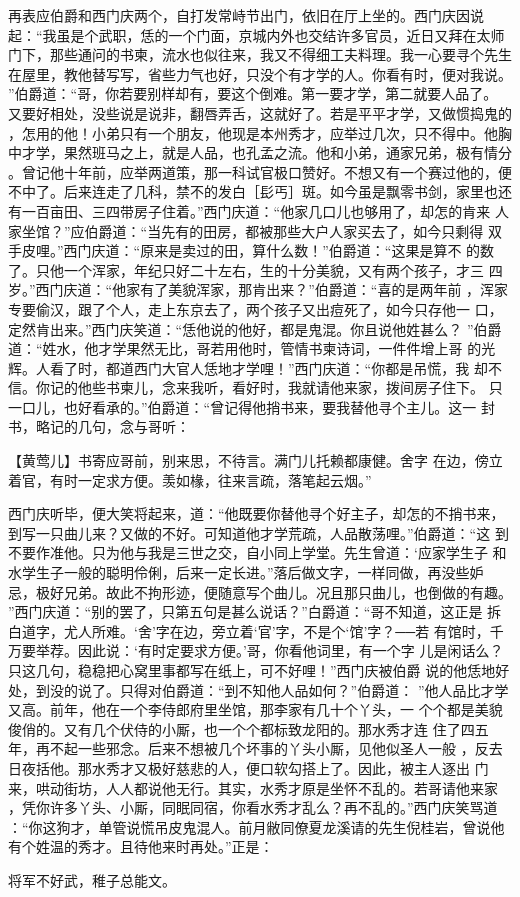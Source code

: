 再表应伯爵和西门庆两个，自打发常峙节出门，依旧在厅上坐的。西门庆因说
起：“我虽是个武职，恁的一个门面，京城内外也交结许多官员，近日又拜在太师
门下，那些通问的书柬，流水也似往来，我又不得细工夫料理。我一心要寻个先生
在屋里，教他替写写，省些力气也好，只没个有才学的人。你看有时，便对我说。
”伯爵道：“哥，你若要别样却有，要这个倒难。第一要才学，第二就要人品了。
又要好相处，没些说是说非，翻唇弄舌，这就好了。若是平平才学，又做惯捣鬼的
，怎用的他！小弟只有一个朋友，他现是本州秀才，应举过几次，只不得中。他胸
中才学，果然班马之上，就是人品，也孔孟之流。他和小弟，通家兄弟，极有情分
。曾记他十年前，应举两道策，那一科试官极口赞好。不想又有一个赛过他的，便
不中了。后来连走了几科，禁不的发白［髟丐］斑。如今虽是飘零书剑，家里也还
有一百亩田、三四带房子住着。”西门庆道：“他家几口儿也够用了，却怎的肯来
人家坐馆？”应伯爵道：“当先有的田房，都被那些大户人家买去了，如今只剩得
双手皮哩。”西门庆道：“原来是卖过的田，算什么数！”伯爵道：“这果是算不
的数了。只他一个浑家，年纪只好二十左右，生的十分美貌，又有两个孩子，才三
四岁。”西门庆道：“他家有了美貌浑家，那肯出来？”伯爵道：“喜的是两年前
，浑家专要偷汉，跟了个人，走上东京去了，两个孩子又出痘死了，如今只存他一
口，定然肯出来。”西门庆笑道：“恁他说的他好，都是鬼混。你且说他姓甚么？
”伯爵道：“姓水，他才学果然无比，哥若用他时，管情书柬诗词，一件件增上哥
的光辉。人看了时，都道西门大官人恁地才学哩！”西门庆道：“你都是吊慌，我
却不信。你记的他些书柬儿，念来我听，看好时，我就请他来家，拨间房子住下。
只一口儿，也好看承的。”伯爵道：“曾记得他捎书来，要我替他寻个主儿。这一
封书，略记的几句，念与哥听：

【黄莺儿】书寄应哥前，别来思，不待言。满门儿托赖都康健。舍字
在边，傍立着官，有时一定求方便。羡如椽，往来言疏，落笔起云烟。”

西门庆听毕，便大笑将起来，道：“他既要你替他寻个好主子，却怎的不捎书来，
到写一只曲儿来？又做的不好。可知道他才学荒疏，人品散荡哩。”伯爵道：“这
到不要作准他。只为他与我是三世之交，自小同上学堂。先生曾道：‘应家学生子
和水学生子一般的聪明伶俐，后来一定长进。”落后做文字，一样同做，再没些妒
忌，极好兄弟。故此不拘形迹，便随意写个曲儿。况且那只曲儿，也倒做的有趣。
”西门庆道：“别的罢了，只第五句是甚么说话？”白爵道：“哥不知道，这正是
拆白道字，尤人所难。‘舍’字在边，旁立着‘官’字，不是个‘馆’字？──若
有馆时，千万要举荐。因此说：‘有时定要求方便。’哥，你看他词里，有一个字
儿是闲话么？只这几句，稳稳把心窝里事都写在纸上，可不好哩！”西门庆被伯爵
说的他恁地好处，到没的说了。只得对伯爵道：“到不知他人品如何？”伯爵道：
”他人品比才学又高。前年，他在一个李侍郎府里坐馆，那李家有几十个丫头，一
个个都是美貌俊俏的。又有几个伏侍的小厮，也一个个都标致龙阳的。那水秀才连
住了四五年，再不起一些邪念。后来不想被几个坏事的丫头小厮，见他似圣人一般
，反去日夜括他。那水秀才又极好慈悲的人，便口软勾搭上了。因此，被主人逐出
门来，哄动街坊，人人都说他无行。其实，水秀才原是坐怀不乱的。若哥请他来家
，凭你许多丫头、小厮，同眠同宿，你看水秀才乱么？再不乱的。”西门庆笑骂道
：“你这狗才，单管说慌吊皮鬼混人。前月敝同僚夏龙溪请的先生倪桂岩，曾说他
有个姓温的秀才。且待他来时再处。”正是：

将军不好武，稚子总能文。